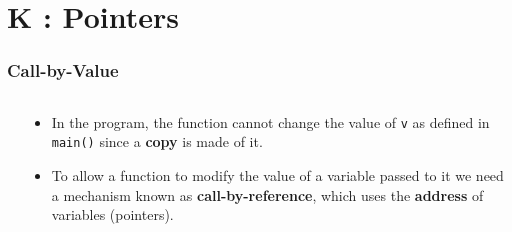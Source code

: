 \section{K : Pointers}
\label{chap:pointers}


\begin{frame}[fragile]
\frametitle{Call-by-Value}
\begin{columns}[T]

\begin{column}{0.45\textwidth}

\pause
{}
\end{column}

\pause
\begin{column}{0.45\textwidth}
\begin{itemize}[<+->]
\item In the program, the function cannot change
the value of \verb^v^ as defined in \verb^main()^ since
a {\bf copy} is made of it.
\item To allow a function to modify the value of a variable
passed to it we need a mechanism known as
{\bf call-by-reference}, which uses the {\bf address}
of variables (pointers). 
\end{itemize}
\end{column}

\end{columns}
\end{frame}



